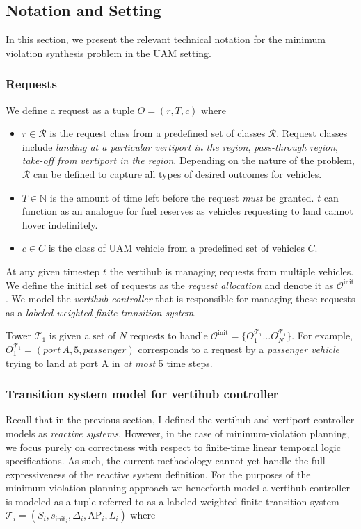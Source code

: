 \subsection{Notation and Setting}\label{sec:background}
In this section, we present the relevant technical notation for the minimum violation synthesis problem in the UAM setting. 

%

\subsubsection{Requests}
We define a request as a tuple $ O = \left(r,T,c \right)$ where
\begin{itemize}
    \item $r \in \mathcal{R}$ is the request class from a predefined set of classes $
    \mathcal{R}$. Request classes include \emph{landing at a particular vertiport in the region}, \emph{pass-through region}, \emph{take-off from vertiport in the region}. Depending on the nature of the problem, $\mathcal{R}$ can be defined to capture all types of desired outcomes for vehicles.   
    \item $T \in \mathbb{N}$ is the amount of time left before the request \emph{must} be granted. $t$ can function as an analogue for fuel reserves as vehicles requesting to land cannot hover indefinitely. 
    \item $c \in C$ is the class of UAM vehicle from a predefined set of vehicles $C$.  
\end{itemize}
At any given timestep $t$ the vertihub is managing requests from multiple vehicles.  We define the initial set of requests as the \emph{request allocation} and denote it as $\mathcal{O}^{\text{init}}$. We model the \emph{vertihub controller} that is responsible for managing these requests as a 
\emph{labeled weighted finite transition system}. 
\begin{eg}
Tower $\mathcal{T}_1$ is given a set of $N$ requests to handle $\mathcal{O}^{\text{init}} = \{O^{\mathcal{T}_1}_1 \dots O^{\mathcal{T}_1}_N \}$. For example, $O^{\mathcal{T}_1}_1 = \left(port\, A, 5, passenger \right)$ corresponds to a request by a \emph{passenger vehicle} trying to land at port A in \emph{at most} 5 time steps. 
\end{eg}




\subsubsection{Transition system model for vertihub controller}
Recall that in the previous section, I defined the vertihub and vertiport controller models as \emph{reactive systems}. However, in the case of minimum-violation planning, we focus purely on correctness with respect to finite-time linear temporal logic specifications. As such, the current methodology cannot yet handle the full expressiveness of the reactive system definition. For the purposes of the minimum-violation planning approach we henceforth model a vertihub controller is modeled as a tuple referred to as a labeled weighted finite transition system $\mathcal{T}_i = \left(S_i, s_{\text{init}_i},\Delta_i, \text{AP}_i,L_i \right)$ where

